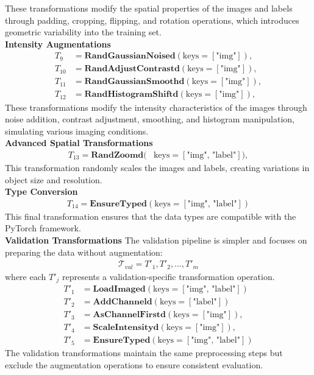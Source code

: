 \documentclass[]{article}
\begin{document}
These transformations modify the spatial properties of the images and labels through padding, cropping, flipping, and rotation operations, which introduces geometric variability into the training set.\\
\textbf{Intensity Augmentations}
\begin{align}
    T_9 &= \textbf{RandGaussianNoised}(\text{keys}=[\text{"img"}]),\\ %
    T_{10} &= \textbf{RandAdjustContrastd}(\text{keys}=[\text{"img"}]),\\ %
    T_{11} &= \textbf{RandGaussianSmoothd}(\text{keys}=[\text{"img"}]),\\ %
    T_{12} &= \textbf{RandHistogramShiftd}(\text{keys}=[\text{"img"}]), %
\end{align}
These transformations modify the intensity characteristics of the images through noise addition, contrast adjustment, smoothing, and histogram manipulation, simulating various imaging conditions.\\
\textbf{Advanced Spatial Transformations}
\begin{align}
T_{13} = \textbf{RandZoomd}(&\text{keys}=[\text{"img", "label"}]), %
\end{align}
This transformation randomly scales the images and labels, creating variations in object size and resolution.\\
\textbf{Type Conversion}
\begin{align}
T_{14} = \textbf{EnsureTyped}(\text{keys}=[\text{"img", "label"}])
\end{align}
This final transformation ensures that the data types are compatible with the PyTorch framework.\\
\textbf{Validation Transformations}
The validation pipeline is simpler and focuses on preparing the data without augmentation:
\begin{align}
\mathcal{T}_{val} = {T'_1, T'_2, \ldots, T'_m}
\end{align}
where each $T'_j$ represents a validation-specific transformation operation.
\begin{align}
    T'_1 &= \textbf{LoadImaged}(\text{keys}=[\text{"img", "label"}]) \\
    T'_2 &= \textbf{AddChanneld}(\text{keys}=[\text{"label"}]) \\
    T'_3 &= \textbf{AsChannelFirstd}(\text{keys}=[\text{"img"}]),\\ %
    T'_4 &= \textbf{ScaleIntensityd}(\text{keys}=[\text{"img"}]), \\
    T'_5 &= \textbf{EnsureTyped}(\text{keys}=[\text{"img", "label"}])
\end{align}
The validation transformations maintain the same preprocessing steps but exclude the augmentation operations to ensure consistent evaluation.\\
\end{document}
